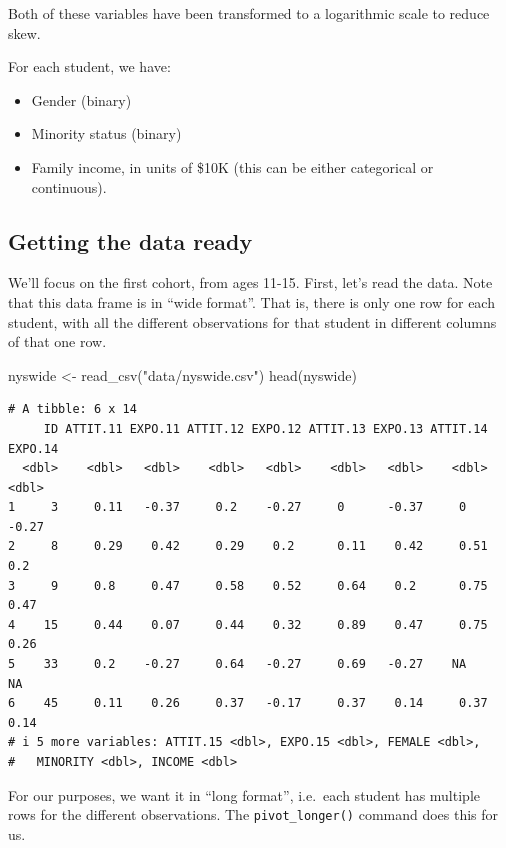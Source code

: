 \documentclass[
  letterpaper,
  DIV=11,
  numbers=noendperiod]{scrreprt}
\newenvironment{Shaded}{}{}
\newcommand{\FunctionTok}[1]{\textcolor[rgb]{0.02,0.16,0.49}{#1}}
\newcommand{\NormalTok}[1]{#1}
\newcommand{\OtherTok}[1]{\textcolor[rgb]{0.00,0.44,0.13}{#1}}
\newcommand{\StringTok}[1]{\textcolor[rgb]{0.25,0.44,0.63}{#1}}
\providecommand{\tightlist}{%
  \setlength{\itemsep}{0pt}\setlength{\parskip}{0pt}}\usepackage{longtable,booktabs,array}
\begin{document}
Both of these variables have been transformed to a logarithmic scale to
reduce skew.

For each student, we have:

\begin{itemize}
\tightlist
\item
  Gender (binary)
\item
  Minority status (binary)
\item
  Family income, in units of \$10K (this can be either categorical or
  continuous).
\end{itemize}

\subsection{Getting the data ready}\label{getting-the-data-ready}

We'll focus on the first cohort, from ages 11-15. First, let's read the
data. Note that this data frame is in ``wide format''. That is, there is
only one row for each student, with all the different observations for
that student in different columns of that one row.

\begin{Shaded}
\begin{Highlighting}[]
\NormalTok{nyswide }\OtherTok{\textless{}{-}} \FunctionTok{read\_csv}\NormalTok{(}\StringTok{"data/nyswide.csv"}\NormalTok{)}
\FunctionTok{head}\NormalTok{(nyswide)}
\end{Highlighting}
\end{Shaded}

\begin{verbatim}
# A tibble: 6 x 14
     ID ATTIT.11 EXPO.11 ATTIT.12 EXPO.12 ATTIT.13 EXPO.13 ATTIT.14 EXPO.14
  <dbl>    <dbl>   <dbl>    <dbl>   <dbl>    <dbl>   <dbl>    <dbl>   <dbl>
1     3     0.11   -0.37     0.2    -0.27     0      -0.37     0      -0.27
2     8     0.29    0.42     0.29    0.2      0.11    0.42     0.51    0.2 
3     9     0.8     0.47     0.58    0.52     0.64    0.2      0.75    0.47
4    15     0.44    0.07     0.44    0.32     0.89    0.47     0.75    0.26
5    33     0.2    -0.27     0.64   -0.27     0.69   -0.27    NA      NA   
6    45     0.11    0.26     0.37   -0.17     0.37    0.14     0.37    0.14
# i 5 more variables: ATTIT.15 <dbl>, EXPO.15 <dbl>, FEMALE <dbl>,
#   MINORITY <dbl>, INCOME <dbl>
\end{verbatim}

For our purposes, we want it in ``long format'', i.e.~each student has
multiple rows for the different observations. The
\texttt{pivot\_longer()} command does this for us.
\end{document}
